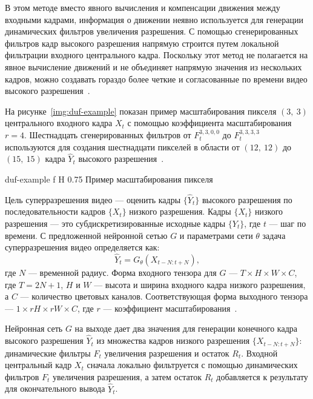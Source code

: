 \documentclass{bmstu}
\begin{document}
В этом методе вместо явного вычисления и компенсации движения между входными кадрами, информация о движении неявно используется для генерации динамических фильтров увеличения разрешения. 
С помощью сгенерированных фильтров кадр высокого разрешения напрямую строится путем локальной фильтрации входного центрального кадра. 
Поскольку этот метод не полагается на явное вычисление движений и не объединяет напрямую значения из нескольких кадров, можно создавать гораздо более четкие и согласованные по времени видео высокого разрешения~\cite{Younghyun2018}.

На рисунке~\ref{img:duf-example} показан пример масштабирования пикселя $(3,~3)$ центрального входного кадра $X_t$ с помощью коэффициента масштабирования $r = 4$. 
Шестнадцать сгенерированных фильтров от $F^{3,3,0,0}_t$ до $F^{3,3,3,3}_t$ используются для создания шестнадцати пикселей в области от $(12,~12)$ до $(15,~15)$ кадра $\hat{Y}_t$ высокого разрешения~\cite{Younghyun2018}.

    {duf-example}
    {f}
    {H}
    {0.75\textwidth}
    {Пример масштабирования пикселя~\cite{Younghyun2018}}
    
Цель суперразрешения видео --- оценить кадры $\{\hat{Y}_t\}$ высокого разрешения по последовательности кадров $\{X_t\}$ низкого разрешения. 
Кадры $\{X_t\}$ низкого разрешения --- это субдискретизированные исходные кадры $\{Y_t\}$, где $t$ --- шаг по времени. 
С предложенной нейронной сетью $G$ и параметрами сети $\theta$ задача суперразрешения видео определяется как:
\begin{equation}
\hat{Y}_t = G_\theta(X_{t - N:t + N}),
\end{equation}
где $N$ --- временной радиус. 
Форма входного тензора для $G$ --- $T \times H \times W \times C$, где $T = 2N + 1$, $H$ и $W$ --- высота и ширина входного кадра низкого разрешения, а $C$ --- количество цветовых каналов. 
Соответствующая форма выходного тензора --- $1 \times rH \times rW \times C$, где $r$ --- коэффициент масштабирования~\cite{Younghyun2018}.

Нейронная сеть $G$ на выходе дает два значения для генерации конечного кадра высокого разрешения $\hat{Y}_t$ из множества кадров низкого разрешения $\{X_{t - N:t + N}\}$: динамические фильтры $F_t$ увеличения разрешения и остаток $R_t$. 
Входной центральный кадр $X_t$ сначала локально фильтруется с помощью динамических фильтров $F_t$ увеличения разрешения, а затем остаток $R_t$ добавляется к результату для окончательного вывода $\hat{Y}_t$.
\end{document}

